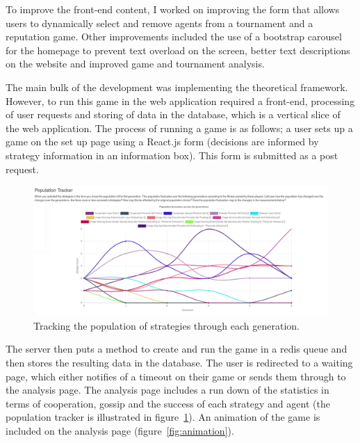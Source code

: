 \documentclass[]{final_report}
\begin{document}
To improve the front-end content, I worked on improving the form that allows users to dynamically select and remove agents from a tournament and a reputation game. Other improvements included the use of a bootstrap carousel for the homepage to prevent text overload on the screen, better text descriptions on the website and improved game and tournament analysis.\par 
The main bulk of the development was implementing the theoretical framework. However, to run this game in the web application required a front-end, processing of user requests and storing of data in the database, which is a vertical slice of the web application. The process of running a game is as follows; a user sets up a game on the set up page using a React.js form (decisions are informed by strategy information in an information box). This form is submitted as a post request.\par 
\begin{figure}
\begin{framed}
	\begin{center}
	\includegraphics[width=\textwidth]{PopulationTracker.png}
	\caption{Tracking the population of strategies through each generation.}
	\label{fig:population_tracker}
	\end{center}
\end{framed}
\end{figure}
The server then puts a method to create and run the game in a redis queue and then stores the resulting data in the database. The user is redirected to a waiting page, which either notifies of a timeout on their game or sends them through to the analysis page. The analysis page includes a run down of the statistics in terms of cooperation, gossip and the success of each strategy and agent (the population tracker is illustrated in figure~\ref{fig:population_tracker}). An animation of the game is included on the analysis page (figure~\ref{fig:animation}).\par 
\end{document}
